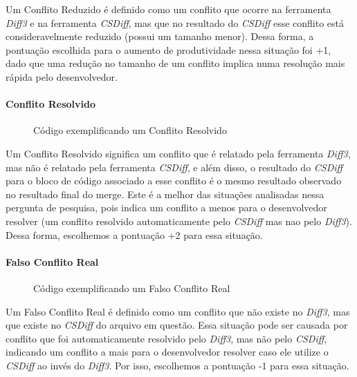 Um Conflito Reduzido é definido como um conflito que ocorre na ferramenta
\emph{Diff3} e na ferramenta \emph{CSDiff}, mas que no resultado do
\emph{CSDiff} esse conflito está consideravelmente reduzido (possui um tamanho
menor). Dessa forma, a pontuação escolhida para o aumento de produtividade
nessa situação foi +1, dado que uma redução no tamanho de um conflito implica
numa resolução mais rápida pelo desenvolvedor.

\paragraph{Conflito Resolvido}
\begin{figure}[ht]
	\begin{center}
		
		\caption{Código exemplificando um Conflito Resolvido}\label{conflito_resolvido}
	\end{center}
\end{figure}

Um Conflito Resolvido significa um conflito que é relatado pela ferramenta
\emph{Diff3}, mas não é relatado pela ferramenta \emph{CSDiff}, e além disso, o
resultado do \emph{CSDiff} para o bloco de código associado a esse conflito é o
mesmo resultado observado no resultado final do merge. Este é a melhor das
situações analisadas nessa pergunta de pesquisa, pois indica um conflito a
menos para o desenvolvedor resolver (um conflito resolvido automaticamente pelo
\emph{CSDiff} mas nao pelo \emph{Diff3}). Dessa forma, escolhemos a pontuação
+2 para essa situação.

\paragraph{Falso Conflito Real}
\begin{figure}[ht]
	\begin{center}
		
		\caption{Código exemplificando um Falso Conflito Real}\label{falso_conflito_real}
	\end{center}
\end{figure}

Um Falso Conflito Real é definido como um conflito que não existe no
\emph{Diff3}, mas que existe no \emph{CSDiff} do arquivo em questão. Essa
situação pode ser causada por conflito que foi automaticamente resolvido pelo
\emph{Diff3}, mas não pelo \emph{CSDiff}, indicando um conflito a mais para o
desenvolvedor resolver caso ele utilize o \emph{CSDiff} ao invés do
\emph{Diff3}. Por isso, escolhemos a pontuação -1 para essa situação.

